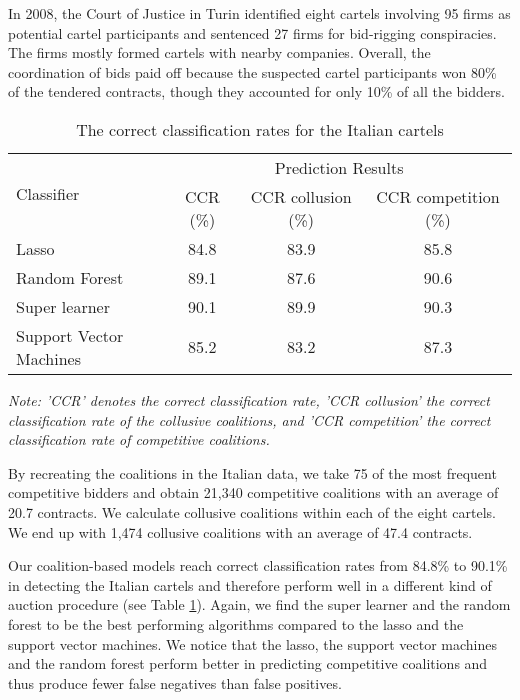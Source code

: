 \documentclass[a4paper,11pt]{article}
\begin{document}
	In 2008, the Court of Justice in Turin identified eight cartels involving 95 firms as potential cartel participants and sentenced 27 firms for bid-rigging conspiracies. The firms mostly formed cartels with nearby companies. Overall, the coordination of bids paid off because the suspected cartel participants won 80\% of the tendered contracts, though they accounted for only 10\% of all the bidders.
	
	
	\begin{table}[ht]
		\caption{The correct classification rates for the Italian cartels}\label{CCRItalcart}
		\begin{center}
			\begin{tabular}{lccc}
				\hline
				\multirow{2}{*}{Classifier} & \multicolumn{3}{c}{Prediction Results}               \\ \cline{2-4} 
				& CCR (\%) & CCR collusion (\%) & CCR competition (\%) \\ \hline
				Lasso                       & 84.8    & 83.9              & 85.8                \\
				Random   Forest             & 89.1    & 87.6              & 90.6                \\
				Super learner               & 90.1    & 89.9              & 90.3                \\
				Support   Vector Machines   & 85.2    & 83.2              & 87.3                \\ \hline
			\end{tabular}
		\end{center}
		\par
		\textit{Note: 'CCR' denotes the correct classification rate, 'CCR collusion' the correct classification rate of the collusive coalitions, and 'CCR competition' the correct classification rate of competitive coalitions.}
	\end{table}
	
	By recreating the coalitions in the Italian data, we take 75 of the most frequent competitive bidders and obtain 21,340 competitive coalitions with an average of 20.7 contracts. We calculate collusive coalitions within each of the eight cartels.  We end up with 1,474 collusive coalitions with an average of 47.4 contracts.
	
	Our coalition-based models reach correct classification rates from 84.8\% to 90.1\% in detecting the Italian cartels and therefore perform well in a different kind of auction procedure (see Table \ref{CCRItalcart}). Again, we find the super learner and the random forest to be the best performing algorithms compared to the lasso and the support vector machines. We notice that the lasso, the support vector machines and the random forest perform better in predicting competitive coalitions and thus produce fewer false negatives than false positives. 
	
\end{document}
